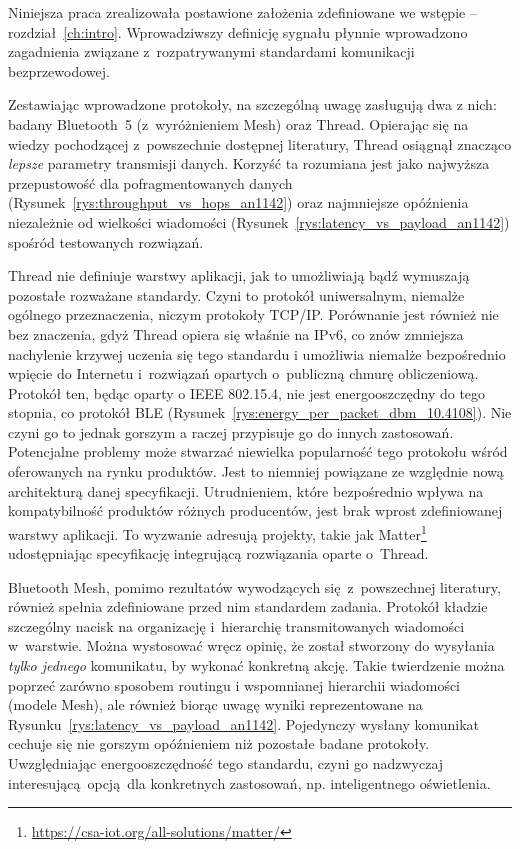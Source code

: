 Niniejsza praca zrealizowała postawione założenia zdefiniowane we wstępie -- rozdział~\ref{ch:intro}.
Wprowadziwszy definicję sygnału płynnie wprowadzono zagadnienia związane z~rozpatrywanymi
standardami komunikacji bezprzewodowej.

Zestawiając wprowadzone protokoły, na szczególną uwagę zasługują dwa z nich: badany Bluetooth~5
(z~wyróżnieniem Mesh) oraz Thread. Opierając się na wiedzy pochodzącej z~powszechnie
dostępnej literatury, Thread osiągnął znacząco \textit{lepsze} parametry transmisji danych.
Korzyść ta rozumiana jest jako najwyższa przepustowość dla pofragmentowanych danych (Rysunek~\ref{rys:throughput_vs_hops_an1142})
oraz najmniejsze opóźnienia niezależnie od wielkości wiadomości (Rysunek~\ref{rys:latency_vs_payload_an1142}) spośród
testowanych rozwiązań.

Thread nie definiuje warstwy aplikacji, jak to umożliwiają bądź wymuszają pozostałe rozważane standardy.
Czyni to protokół uniwersalnym, niemalże ogólnego przeznaczenia, niczym protokoły TCP/IP. Porównanie jest
również nie bez znaczenia, gdyż Thread opiera się właśnie na IPv6, co znów zmniejsza nachylenie
krzywej uczenia się tego standardu i umożliwia niemalże bezpośrednio wpięcie do Internetu i~rozwiązań opartych
o~publiczną chmurę obliczeniową. Protokół ten, będąc oparty o IEEE 802.15.4, nie jest energooszczędny
do tego stopnia, co protokół BLE (Rysunek~\ref{rys:energy_per_packet_dbm_10.4108}). 
Nie czyni go to jednak gorszym a raczej przypisuje go do innych
zastosowań. Potencjalne problemy może stwarzać niewielka popularność tego protokołu wśród oferowanych
na rynku produktów. Jest to niemniej powiązane ze względnie nową architekturą danej specyfikacji.
Utrudnieniem, które bezpośrednio wpływa na kompatybilność produktów różnych producentów, jest brak
wprost zdefiniowanej warstwy aplikacji. To wyzwanie adresują projekty, takie jak 
Matter\footnote{\url{https://csa-iot.org/all-solutions/matter/}}
udostępniając specyfikację integrującą rozwiązania oparte o~Thread.

Bluetooth Mesh, pomimo rezultatów wywodzących się z~powszechnej literatury, również spełnia 
zdefiniowane przed nim standardem zadania. Protokół kładzie szczególny nacisk na organizację
i~hierarchię transmitowanych wiadomości w~warstwie. Można wystosować wręcz opinię, że został stworzony
do wysyłania \textit{tylko jednego} komunikatu, by wykonać konkretną akcję. Takie twierdzenie można
poprzeć zarówno sposobem routingu i wspomnianej hierarchii wiadomości (modele Mesh), ale również
biorąc uwagę wyniki reprezentowane na Rysunku~\ref{rys:latency_vs_payload_an1142}. Pojedynczy wysłany
komunikat cechuje się nie gorszym opóźnieniem niż pozostałe badane protokoły. Uwzględniając energooszczędność
tego standardu, czyni go nadzwyczaj interesującą opcją dla konkretnych zastosowań, np. inteligentnego
oświetlenia.

